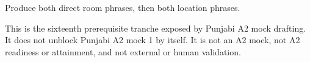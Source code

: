 \begin{tcolorbox}[breakable,colback=teal!4,colframe=teal!35!black,title={Before you move on}]
Produce both direct room phrases, then both location phrases.

This is the sixteenth prerequisite tranche exposed by Punjabi A2 mock drafting. It does not unblock Punjabi A2 mock 1 by itself. It is not an A2 mock, not A2 readiness or attainment, and not external or human validation.
\end{tcolorbox}
